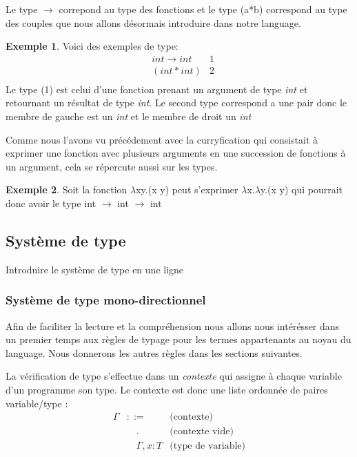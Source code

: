 \documentclass {article}
\theoremstyle{definition}
\newtheorem{example}{Exemple}
\theoremstyle{remark}
\begin{document}
Le type \(\rightarrow\) correpond au type des fonctions et le type (a*b)
correspond au type des couples que nous allons désormais introduire dans notre language.

\begin{example}
  Voici des exemples de type:
  \begin{align*}
  & int \rightarrow int & \mbox{1} \\
  & (int * int) &\mbox{2} \\
  \end{align*}
  Le type (1) est celui d'une fonction prenant un argument de type \emph{int} et 
  retournant un résultat de type \emph{int}.
  Le second type correspond a une pair donc le membre de gauche est un \emph{int}
  et le membre de droit un \emph{int}
\end{example}

Comme nous l'avons vu précédement avec la curryfication qui consistait à exprimer une 
fonction avec plusieurs arguments en une succession de fonctions à un argument, cela 
se répercute aussi sur les types.

\begin{example}
  Soit la fonction \(\lambda\)x\:y.(x y) peut s'exprimer 
  \(\lambda\)x.\(\lambda\)y.(x y) qui pourrait donc avoir 
  le type int \(\rightarrow\) int \(\rightarrow\) int  
\end{example}

\subsection{Système de type}

Introduire le système de type en une ligne
\subsubsection{Système de type mono-directionnel}

Afin de faciliter la lecture et la compréhension nous allons nous intérésser dans 
un premier temps aux règles de typage pour les termes appartenants au noyau 
du language. Nous donnerons les autres règles dans les sections suivantes.

La vérification de type s'effectue dans un \emph{contexte} qui assigne
à chaque variable d'un programme son type. Le contexte est donc une
liste ordonnée de paires variable/type :
%
\begin{align*}
  \Gamma &::= &\mbox{(contexte)} \\
         &\quad . & \mbox{(contexte vide)} \\
         &\quad \Gamma, x : T & \mbox{(type de variable)} 
\end{align*}
\end{document}
